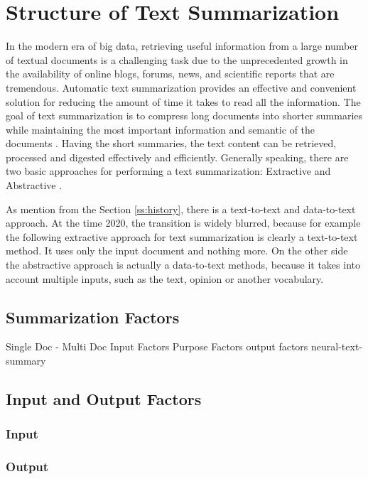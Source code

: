 \section{Structure of Text Summarization}

In the modern era of big data, retrieving useful information from a large number of textual documents is a challenging task due to the unprecedented growth in the availability of online blogs, forums, news, and scientific reports that are tremendous. Automatic text summarization provides an effective and convenient solution for reducing the amount of time it takes to read all the information. The goal of text summarization is to compress long documents into shorter summaries while maintaining the most important information and semantic of the documents \cite{ts-intro} \cite{ts-intro2}. Having the short summaries, the text content can be retrieved, processed and digested effectively and efficiently. 
Generally speaking, there are two basic approaches for performing a text summarization: Extractive and Abstractive \cite{ts-intro3}. 

As mention from the Section \ref{ss:history}, there is a text-to-text and data-to-text approach. At the time 2020, the transition is widely blurred, because for example the following extractive approach for text summarization is clearly a text-to-text method. It uses only the input document and nothing more. On the other side the abstractive approach is actually a data-to-text methods, because it takes into account multiple inputs, such as the text, opinion or another vocabulary.



\subsection{Summarization Factors}

Single Doc - Multi Doc
Input Factors
Purpose Factors
output factors
neural-text-summary

\subsection{Input and Output Factors}
\subsubsection{Input}
\subsubsection{Output}
